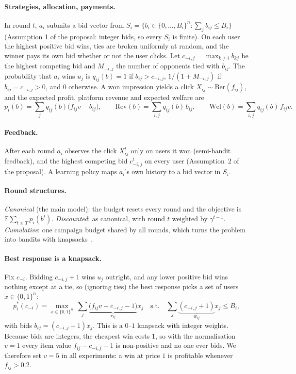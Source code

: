 \documentclass{article}
\theoremstyle{definition}
\newcommand{\E}{\mathbb{E}}
\begin{document}
\paragraph{Strategies, allocation, payments.} In round $t$, $a_i$ submits a bid vector from
$S_i=\{b_i\in\{0,\dots,B_i\}^n:\sum_j b_{ij}\le B_i\}$ (Assumption 1 of the proposal: integer bids, so
every $S_i$ is finite). On each user the highest positive bid wins, ties are broken uniformly at random,
and the winner pays its own bid whether or not the user clicks. Let $c_{-i,j}=\max_{k\ne i}b_{kj}$ be the
highest competing bid and $M_{-i,j}$ the number of opponents tied with $b_{ij}$. The probability that
$a_i$ wins $u_j$ is $q_{ij}(b)=1$ if $b_{ij}>c_{-i,j}$, $1/(1+M_{-i,j})$ if $b_{ij}=c_{-i,j}>0$, and $0$
otherwise. A won impression yields a click $X_{ij}\sim\mathrm{Ber}(f_{ij})$, and the expected profit,
platform revenue and expected welfare are
\begin{equation}\label{eq:profit}
  p_i(b)=\sum_{j} q_{ij}(b)\big(f_{ij}v-b_{ij}\big),\qquad
  \mathrm{Rev}(b)=\sum_{i,j}q_{ij}(b)\,b_{ij},\qquad
  \mathrm{Wel}(b)=\sum_{i,j}q_{ij}(b)\,f_{ij}v .
\end{equation}

\paragraph{Feedback.} After each round $a_i$ observes the click $X^t_{ij}$ only on users it won
(semi-bandit feedback), and the highest competing bid $c^t_{-i,j}$ on every user (Assumption~2 of the
proposal). A learning policy maps $a_i$'s own history to a bid vector in $S_i$.

\paragraph{Round structures.} \emph{Canonical} (the main model): the budget resets every round and the
objective is $\E\sum_{t\le T}p_i(b^t)$. \emph{Discounted}: as canonical, with round $t$ weighted by
$\gamma^{t-1}$. \emph{Cumulative}: one campaign budget shared by all rounds, which turns the problem into
bandits with knapsacks~\citep{badanidiyuru2013bandits}.

\paragraph{Best response is a knapsack.} Fix $c_{-i}$. Bidding $c_{-i,j}+1$ wins $u_j$ outright, and any
lower positive bid wins nothing except at a tie, so (ignoring ties) the best response picks a set of users
$x\in\{0,1\}^n$:
\begin{equation}\label{eq:knap}
  p_i^\ast(c_{-i})=\max_{x\in\{0,1\}^n}\ \sum_j \underbrace{\big(f_{ij}v-c_{-i,j}-1\big)}_{r_{ij}}x_j
  \quad\text{s.t.}\quad \sum_j \underbrace{(c_{-i,j}+1)}_{w_{ij}}x_j\le B_i ,
\end{equation}
with bids $b_{ij}=(c_{-i,j}+1)x_j$. This is a $0$--$1$ knapsack with integer weights. Because bids are
integers, the cheapest win costs $1$, so with the normalisation $v=1$ every item value $f_{ij}-c_{-i,j}-1$
is non-positive and no one ever bids. We therefore set $v=5$ in all experiments: a win at price $1$ is
profitable whenever $f_{ij}>0.2$.
\end{document}
